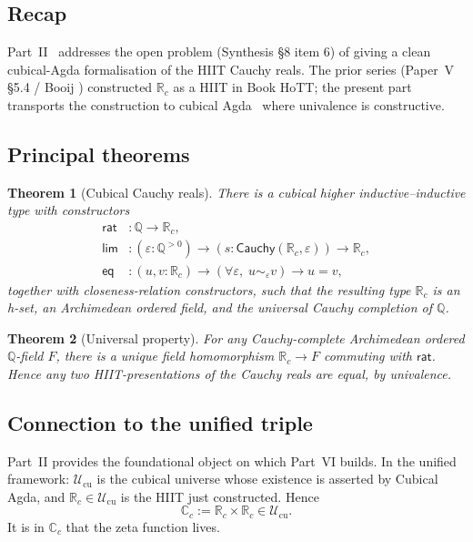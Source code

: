 \documentclass[12pt]{article}
\newtheorem{theorem}{Theorem}[section]
\theoremstyle{definition}
\theoremstyle{remark}
\newcommand{\Type}{\mathcal{U}}
\newcommand{\Q}{\mathbb{Q}}
\newcommand{\R}{\mathbb{R}}
\newcommand{\C}{\mathbb{C}}
\newcommand{\Rc}{\R_{c}}
\newcommand{\Cc}{\C_{c}}
\newcommand{\bisim}{\mathrel{\sim}}
\newcommand{\rat}{\mathsf{rat}}
\newcommand{\hlim}{\mathsf{lim}}
\newcommand{\Cauchy}{\mathsf{Cauchy}}
\begin{document}
\subsection{Recap}

Part~II~\cite{cubicalHiitCauchy} addresses the open problem (Synthesis
\S 8 item 6) of giving a clean cubical-Agda formalisation of the HIIT
Cauchy reals. The prior series (Paper~V \S 5.4 / Booij \cite{Booij2020})
constructed $\Rc$ as a HIIT in Book HoTT; the present part transports the
construction to cubical Agda~\cite{CubicalAgda} where univalence is
constructive.

\subsection{Principal theorems}

\begin{theorem}[Cubical Cauchy reals]
There is a cubical higher inductive--inductive type with constructors
\begin{align*}
\rat &: \Q \to \Rc, \\
\hlim &: (\varepsilon : \Q^{>0}) \to (s : \Cauchy(\Rc,\varepsilon)) \to \Rc, \\
\mathsf{eq} &: (u, v : \Rc) \to (\forall \varepsilon,\; u \bisim_\varepsilon v) \to u = v,
\end{align*}
together with closeness-relation constructors, such that the resulting
type $\Rc$ is an h-set, an Archimedean ordered field, and the universal
Cauchy completion of $\Q$.
\end{theorem}

\begin{theorem}[Universal property]
For any Cauchy-complete Archimedean ordered $\Q$-field $F$, there is a
unique field homomorphism $\Rc \to F$ commuting with $\rat$. Hence any two
HIIT-presentations of the Cauchy reals are equal, by univalence.
\end{theorem}

\subsection{Connection to the unified triple}

Part~II provides the foundational object on which Part~VI builds. In the
unified framework: $\Type_{\mathrm{cu}}$ is the cubical universe whose
existence is asserted by Cubical Agda, and $\Rc \in \Type_{\mathrm{cu}}$
is the HIIT just constructed. Hence
\[
\Cc := \Rc \times \Rc \in \Type_{\mathrm{cu}}.
\]
It is in $\Cc$ that the zeta function lives.
\end{document}
